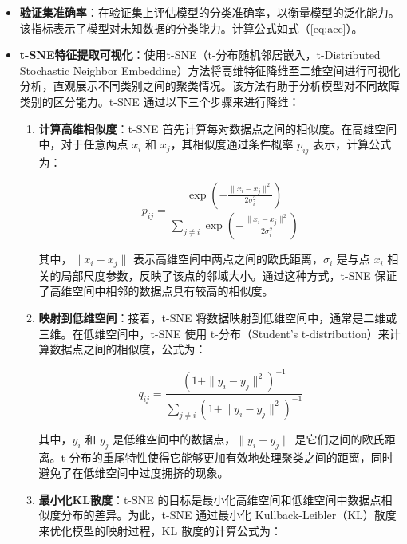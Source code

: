 \documentclass[master]{thesis-uestc}
\begin{document}
\begin{itemize}
      \begin{itemize}
          \item \textbf{验证集准确率}：在验证集上评估模型的分类准确率，以衡量模型的泛化能力。该指标表示了模型对未知数据的分类能力。计算公式如式（\ref{eq:acc}）。
          \item \textbf{t-SNE特征提取可视化}：使用t-SNE（t-分布随机邻居嵌入，t-Distributed Stochastic Neighbor Embedding）方法将高维特征降维至二维空间进行可视化分析，直观展示不同类别之间的聚类情况。该方法有助于分析模型对不同故障类别的区分能力。t-SNE 通过以下三个步骤来进行降维：

        \begin{enumerate}
            \item \textbf{计算高维相似度}：t-SNE 首先计算每对数据点之间的相似度。在高维空间中，对于任意两点 \(x_i\) 和 \(x_j\)，其相似度通过条件概率 \(p_{ij}\) 表示，计算公式为：
            
            \begin{equation}
            p_{ij} = \frac{\exp\left( -\frac{\|x_i - x_j\|^2}{2\sigma_i^2} \right)}{\sum_{j \neq i} \exp\left( -\frac{\|x_i - x_j\|^2}{2\sigma_i^2} \right)}
            \end{equation}
            
            其中，\(\|x_i - x_j\|\) 表示高维空间中两点之间的欧氏距离，\(\sigma_i\) 是与点 \(x_i\) 相关的局部尺度参数，反映了该点的邻域大小。通过这种方式，t-SNE 保证了高维空间中相邻的数据点具有较高的相似度。
            
            \item \textbf{映射到低维空间}：接着，t-SNE 将数据映射到低维空间中，通常是二维或三维。在低维空间中，t-SNE 使用 t-分布（Student's t-distribution）来计算数据点之间的相似度，公式为：
            
            \begin{equation}
            q_{ij} = \frac{\left( 1 + \|y_i - y_j\|^2 \right)^{-1}}{\sum_{j \neq i} \left( 1 + \|y_i - y_j\|^2 \right)^{-1}}
            \end{equation}
            
            其中，\(y_i\) 和 \(y_j\) 是低维空间中的数据点，\(\|y_i - y_j\|\) 是它们之间的欧氏距离。t-分布的重尾特性使得它能够更加有效地处理聚类之间的距离，同时避免了在低维空间中过度拥挤的现象。
            
            \item \textbf{最小化KL散度}：t-SNE 的目标是最小化高维空间和低维空间中数据点相似度分布的差异。为此，t-SNE 通过最小化 Kullback-Leibler（KL）散度来优化模型的映射过程，KL 散度的计算公式为：
            

\end{enumerate}
\end{itemize}
\end{itemize}
\end{document}
